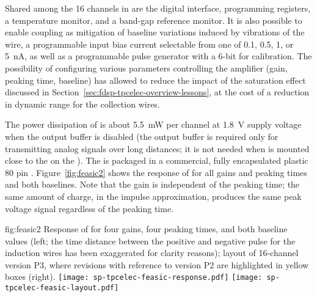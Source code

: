 Shared among the \num{16} channels in  are 
the digital interface, programming registers, a temperature monitor, 
and a band-gap reference monitor. It is also possible to enable  
coupling as mitigation of baseline variations induced by vibrations
of the  wire, a programmable input bias current 
selectable from one of \num{0.1}, \num{0.5}, \num{1}, or \SI{5}{nA}, 
as well as a programmable pulse generator with a \num{6}-bit 
 for calibration. The possibility of configuring various
parameters controlling the  amplifier (gain, peaking time,
baseline) has allowed  to reduce the impact of the
saturation effect discussed in Section~\ref{sec:fdsp-tpcelec-overview-lessons}, 
at the cost of a reduction in dynamic range for the collection wires.

The power dissipation of  is about \SI{5.5}{mW} 
per channel at \SI{1.8}{V} supply voltage when the output buffer is
disabled (the output buffer is required only for transmitting analog
signals over long distances; it is not needed when 
is mounted close to the  on the ).
The  is packaged in a commercial, fully encapsulated 
plastic \num{80} pin . Figure~\ref{fig:feasic2} shows the 
response of  for all gains and peaking times 
and both baselines. Note that the gain is independent of the peaking 
time; the same amount of charge, in the impulse approximation, produces 
the same peak voltage signal regardless of the peaking time.

\begin{dunefigure}
{fig:feasic2}
{Response of  for four gains, four peaking times, 
and both baseline values (left; the time distance between the positive
and negative pulse for the induction wires has been exaggerated
for clarity reasons); layout of \num{16}-channel
 version P3, where revisions with reference to version 
P2 are highlighted in yellow boxes (right).}
\texttt{[image: sp-tpcelec-feasic-response.pdf]}
\hspace{6mm}
\texttt{[image: sp-tpcelec-feasic-layout.pdf]}
\end{dunefigure}

